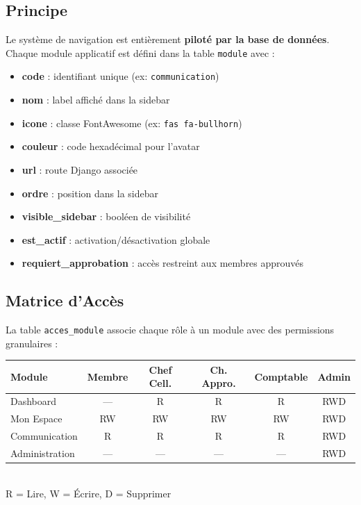 \documentclass[12pt,a4paper]{article}
\begin{document}
\subsection{Principe}

Le système de navigation est entièrement \textbf{piloté par la base de données}. Chaque module applicatif est défini dans la table \texttt{module} avec :

\begin{itemize}
    \item \textbf{code} : identifiant unique (ex: \texttt{communication})
    \item \textbf{nom} : label affiché dans la sidebar
    \item \textbf{icone} : classe FontAwesome (ex: \texttt{fas fa-bullhorn})
    \item \textbf{couleur} : code hexadécimal pour l'avatar
    \item \textbf{url} : route Django associée
    \item \textbf{ordre} : position dans la sidebar
    \item \textbf{visible\_sidebar} : booléen de visibilité
    \item \textbf{est\_actif} : activation/désactivation globale
    \item \textbf{requiert\_approbation} : accès restreint aux membres approuvés
\end{itemize}

\subsection{Matrice d'Accès}

La table \texttt{acces\_module} associe chaque rôle à un module avec des permissions granulaires :

\begin{center}
\begin{tabular}{lccccc}
\toprule
\textbf{Module} & \textbf{Membre} & \textbf{Chef Cell.} & \textbf{Ch. Appro.} & \textbf{Comptable} & \textbf{Admin} \\
\midrule
Dashboard & — & R & R & R & RWD \\
Mon Espace & RW & RW & RW & RW & RWD \\
Communication & R & R & R & R & RWD \\
Administration & — & — & — & — & RWD \\
\bottomrule
\end{tabular}\\[0.3em]
{\small R = Lire, W = Écrire, D = Supprimer}
\end{center}
\end{document}
